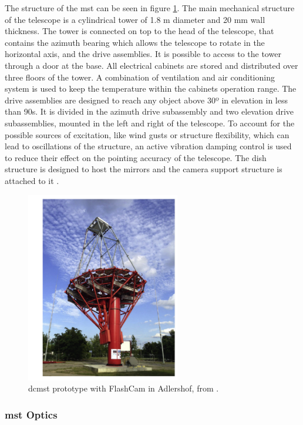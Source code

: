 \documentclass[main.tex]{subfiles}
\begin{document}
The structure of the \gls{mst} can be seen in figure \ref{fig:2MST}.
The main mechanical structure of the telescope is a cylindrical tower of 1.8 m diameter and 20 mm wall thickness. The tower is connected on top to the head of the telescope, that contains the azimuth bearing which allows the telescope to rotate in the horizontal axis, and the drive assemblies. It is possible to access to the tower through a door at the base. All electrical cabinets are stored and distributed over three floors of the tower. A combination of ventilation and air conditioning system is used to keep the temperature within the cabinets operation range.
The drive assemblies are designed to reach any object above 30º in elevation in less than 90s. It is divided in the azimuth drive subassembly and two elevation drive subassemblies, mounted in the left and right of the telescope.
To account for the possible sources of excitation, like wind gusts or structure flexibility, which can lead to oscillations of the structure, an active vibration damping control is used to reduce their effect on the pointing accuracy of the telescope.
The dish structure is designed to host the mirrors and the camera support structure is attached to it \cite{2015DCMSTstatus}.

\begin{figure}[h]
\centering
 \includegraphics[width=0.6\textwidth]{Pictures/MST.pdf}
  \caption{\gls{dcmst} prototype with FlashCam in Adlershof, from \cite{2018MSTandLSTstatus}.}
    \label{fig:2MST}
\end{figure}

\subsubsection{\gls{mst} Optics}
\end{document}

